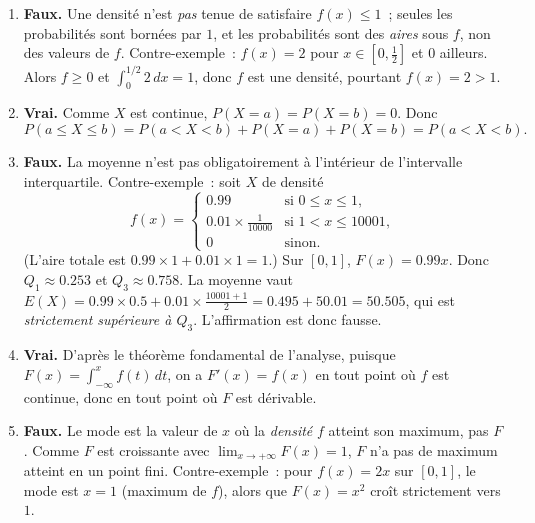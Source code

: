 \documentclass[11pt]{article}
\begin{document}
\begin{corrige}
\begin{enumerate}
\item \textbf{Faux.} Une densité n'est \emph{pas} tenue de satisfaire $f(x) \leq 1$~; seules les probabilités sont bornées par $1$, et les probabilités sont des \emph{aires} sous $f$, non des valeurs de $f$. Contre-exemple~: $f(x) = 2$ pour $x \in [0, \tfrac12]$ et $0$ ailleurs. Alors $f \geq 0$ et $\int_0^{1/2} 2\,dx = 1$, donc $f$ est une densité, pourtant $f(x) = 2 > 1$.
\item \textbf{Vrai.} Comme $X$ est continue, $P(X = a) = P(X = b) = 0$. Donc
\[ P(a \leq X \leq b) = P(a < X < b) + P(X=a) + P(X=b) = P(a < X < b). \]
\item \textbf{Faux.} La moyenne n'est pas obligatoirement à l'intérieur de l'intervalle interquartile. Contre-exemple~: soit $X$ de densité
\[ f(x) = \begin{cases} 0.99 & \text{si } 0 \leq x \leq 1, \\ 0.01 \times \frac{1}{10000} & \text{si } 1 < x \leq 10001, \\ 0 & \text{sinon.} \end{cases} \]
(L'aire totale est $0.99 \times 1 + 0.01 \times 1 = 1$.)
Sur $[0,1]$, $F(x) = 0.99x$. Donc $Q_1 \approx 0.253$ et $Q_3 \approx 0.758$.
La moyenne vaut $E(X) = 0.99 \times 0.5 + 0.01 \times \frac{10001+1}{2} = 0.495 + 50.01 = 50.505$, qui est \emph{strictement supérieure à $Q_3$}. L'affirmation est donc fausse.
\item \textbf{Vrai.} D'après le théorème fondamental de l'analyse, puisque $F(x) = \displaystyle\int_{-\infty}^{x} f(t)\,dt$, on a $F'(x) = f(x)$ en tout point où $f$ est continue, donc en tout point où $F$ est dérivable.
\item \textbf{Faux.} Le mode est la valeur de $x$ où la \emph{densité} $f$ atteint son maximum, pas $F$. Comme $F$ est croissante avec $\lim_{x\to+\infty} F(x) = 1$, $F$ n'a pas de maximum atteint en un point fini. Contre-exemple~: pour $f(x) = 2x$ sur $[0,1]$, le mode est $x = 1$ (maximum de $f$), alors que $F(x) = x^2$ croît strictement vers $1$.
\end{enumerate}
\end{corrige}
\end{document}
